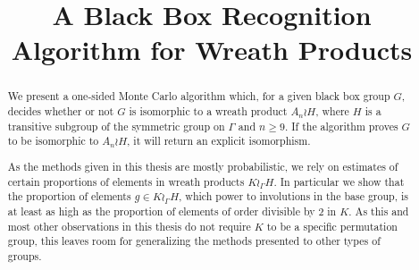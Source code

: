 \documentclass[
12pt, %
english, %
singlespacing, %
headsepline, %
]{scrartcl} %
\title{A Black Box Recognition Algorithm for Wreath Products}
\begin{document}
\maketitle

\begin{abstract}
\vspace{2cm}
We present a one-sided Monte Carlo algorithm which, for a given black box group $G$,
decides whether or not $G$ is isomorphic to a wreath product $A_n\wr H$, where $H$ is a transitive subgroup of the symmetric group on $\Gamma$ and $n\geq 9$.
If the algorithm proves $G$ to be isomorphic to $A_n\wr H$, it will return an explicit isomorphism.

As the methods given in this thesis are mostly probabilistic, we rely on estimates of certain proportions
of elements in wreath products $K\wr_\Gamma H$.
In particular we show that the proportion of elements $g\in K\wr_\Gamma H$, which power to involutions in the base group, is at least as high as the proportion of
elements of order divisible by 2 in $K$.
As this and most other observations in this thesis do not require $K$ to be a specific permutation group, this leaves room for generalizing the methods presented to other types of groups.
\vspace{2cm}
\vspace{2cm}
% 
% 
% 
% 
\end{abstract}







\printbibliography[heading=bibintoc]

\end{document}
